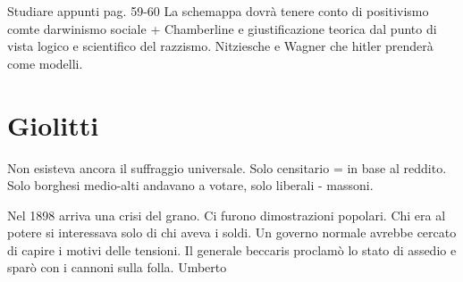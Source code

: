 \documentclass{article}
\begin{document}
    Studiare appunti pag. 59-60
    La schemappa dovrà tenere conto di positivismo comte darwinismo sociale + Chamberline e giustificazione teorica dal punto di vista logico e scientifico del razzismo. Nitziesche e Wagner che hitler prenderà come modelli.

    \section{Giolitti}

    Non esisteva ancora il suffraggio universale. Solo censitario = in base al reddito. Solo borghesi medio-alti andavano a votare, solo liberali - massoni.

    Nel 1898 arriva una crisi del grano. Ci furono dimostrazioni popolari. Chi era al potere si interessava solo di chi aveva i soldi. Un governo normale avrebbe cercato di capire i motivi delle tensioni. Il generale beccaris proclamò lo stato di assedio e sparò con i cannoni sulla folla. Umberto 
\end{document}
